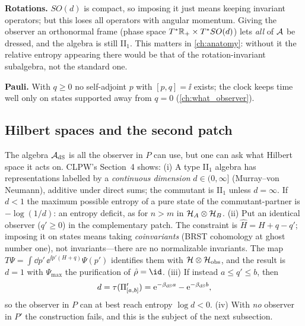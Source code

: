 \textbf{Rotations.} $SO(d)$ is compact, so imposing it just means keeping invariant operators; but this loses all operators with angular momentum. Giving the observer an orthonormal frame (phase space $T^*\mathbb{R}_+\times T^*SO(d)$) lets \emph{all} of $\mathcal{A}$ be dressed, and the algebra is still II$_1$. This matters in \cref{ch:anatomy}: without it the relative entropy appearing there would be that of the rotation-invariant subalgebra, not the standard one.

\textbf{Pauli.} With $q\ge0$ no self-adjoint $p$ with $[p,q]=\ii$ exists; the clock keeps time well only on states supported away from $q=0$ (\cref{ch:what_observer}).

\subsection{Hilbert spaces and the second patch}

The algebra $\mathcal{A}_{\rm dS}$ is all the observer in $P$ can use, but one can ask what Hilbert space it acts on. CLPW's Section~4 shows: (i) A type II$_1$ algebra has representations labelled by a \emph{continuous dimension} $d\in(0,\infty]$ (Murray--von Neumann), additive under direct sums; the commutant is II$_1$ unless $d=\infty$. If $d<1$ the maximum possible entropy of a pure state of the commutant-partner is $-\log(1/d)$: an entropy deficit, as for $n>m$ in $\mathcal{H}_A\otimes\mathcal{H}_B$. (ii) Put an identical observer ($q'\ge0$) in the complementary patch. The constraint is $\hat H=H+q-q'$; imposing it on states means taking \emph{coinvariants} (BRST cohomology at ghost number one), not invariants---there are no normalizable invariants. The map $T\Psi=\int\dd p'\,\ee^{\ii p'(H+q)}\Psi(p')$ identifies them with $\mathcal{H}\otimes\mathcal{H}_{\rm obs}$, and the result is $d=1$ with $\Psi_{\max}$ the purification of $\hat\rho=\id$. (iii) If instead $a\le q'\le b$, then
\begin{equation}
d=\tau(\Pi'_{[a,b]})=\mathrm{e}^{-\beta_{\rm dS}a}-\mathrm{e}^{-\beta_{\rm dS}b},
\end{equation}
so the observer in $P$ can at best reach entropy $\log d<0$. (iv) With \emph{no} observer in $P'$ the construction fails, and this is the subject of the next subsection.

